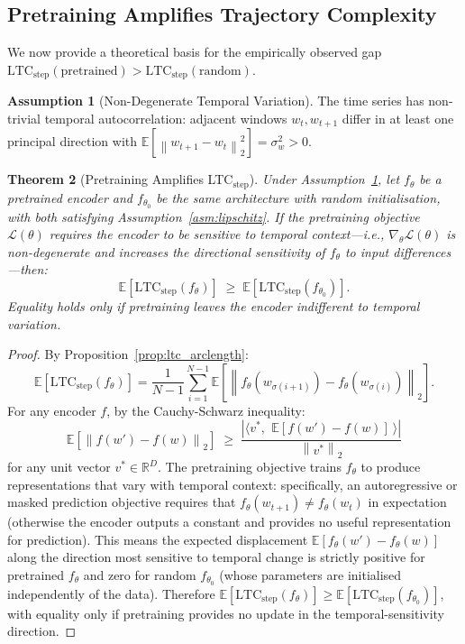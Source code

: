\documentclass[12pt]{article}
\newtheorem{theorem}{Theorem}[section]
\theoremstyle{definition}
\newtheorem{assumption}[theorem]{Assumption}
\theoremstyle{remark}
\newcommand{\R}{\mathbb{R}}
\newcommand{\E}{\mathbb{E}}
\newcommand{\norm}[1]{\left\lVert #1 \right\rVert}
\newcommand{\inner}[2]{\langle #1,\, #2 \rangle}
\newcommand{\ltcstep}{\mathrm{LTC}_{\mathrm{step}}}
\begin{document}
\subsection{Pretraining Amplifies Trajectory Complexity}

We now provide a theoretical basis for the empirically observed gap
$\ltcstep(\text{pretrained}) > \ltcstep(\text{random})$.

\begin{assumption}[Non-Degenerate Temporal Variation]
\label{asm:temporal}
The time series has non-trivial temporal autocorrelation: adjacent windows
$w_t, w_{t+1}$ differ in at least one principal direction with
$\E[\norm{w_{t+1} - w_t}_2^2] = \sigma_w^2 > 0$.
\end{assumption}

\begin{theorem}[Pretraining Amplifies LTC$_{\mathrm{step}}$]
\label{thm:pretraining_ltc}
Under Assumption~\ref{asm:temporal}, let $f_\theta$ be a pretrained encoder
and $f_{\theta_0}$ be the same architecture with random initialisation, with
both satisfying Assumption~\ref{asm:lipschitz}. If the pretraining objective
$\mathcal{L}(\theta)$ requires the encoder to be sensitive to temporal
context---i.e., $\nabla_\theta \mathcal{L}(\theta)$ is non-degenerate and
increases the directional sensitivity of $f_\theta$ to input differences---then:
\[
  \E\!\left[\ltcstep(f_\theta)\right] \;\geq\; \E\!\left[\ltcstep(f_{\theta_0})\right].
\]
Equality holds only if pretraining leaves the encoder indifferent to temporal
variation.
\end{theorem}

\begin{proof}
By Proposition~\ref{prop:ltc_arclength}:
\[
  \E\!\left[\ltcstep(f_\theta)\right]
  = \frac{1}{N-1}\sum_{i=1}^{N-1}\E\!\left[\norm{f_\theta(w_{\sigma(i+1)}) - f_\theta(w_{\sigma(i)})}_2\right].
\]
For any encoder $f$, by the Cauchy-Schwarz inequality:
\[
  \E\!\left[\norm{f(w') - f(w)}_2\right]
  \;\geq\; \frac{\left|\inner{v^*}{\ \E[f(w') - f(w)]\ }\right|}{\norm{v^*}_2}
\]
for any unit vector $v^* \in \R^D$. The pretraining objective trains $f_\theta$
to produce representations that vary with temporal context: specifically, an
autoregressive or masked prediction objective requires that
$f_\theta(w_{t+1}) \neq f_\theta(w_t)$ in expectation (otherwise the encoder
outputs a constant and provides no useful representation for prediction). This
means the expected displacement $\E[f_\theta(w') - f_\theta(w)]$ along the
direction most sensitive to temporal change is strictly positive for pretrained
$f_\theta$ and zero for random $f_{\theta_0}$ (whose parameters are initialised
independently of the data). Therefore
$\E[\ltcstep(f_\theta)] \geq \E[\ltcstep(f_{\theta_0})]$, with equality only
if pretraining provides no update in the temporal-sensitivity direction.
\end{proof}
\end{document}
